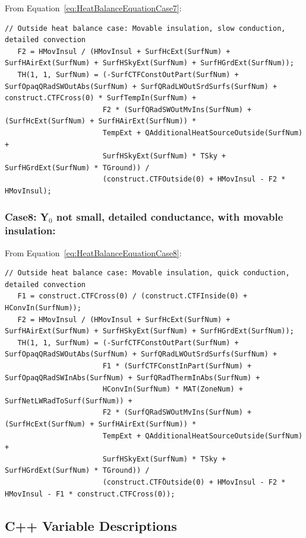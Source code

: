 From Equation~\ref{eq:HeatBalanceEquationCase7}:

\begin{lstlisting}
// Outside heat balance case: Movable insulation, slow conduction, detailed convection
   F2 = HMovInsul / (HMovInsul + SurfHcExt(SurfNum) + SurfHAirExt(SurfNum) + SurfHSkyExt(SurfNum) + SurfHGrdExt(SurfNum));
   TH(1, 1, SurfNum) = (-SurfCTFConstOutPart(SurfNum) + SurfOpaqQRadSWOutAbs(SurfNum) + SurfQRadLWOutSrdSurfs(SurfNum) + construct.CTFCross(0) * SurfTempIn(SurfNum) +
                       F2 * (SurfQRadSWOutMvIns(SurfNum) + (SurfHcExt(SurfNum) + SurfHAirExt(SurfNum)) *
                       TempExt + QAdditionalHeatSourceOutside(SurfNum) +
                       SurfHSkyExt(SurfNum) * TSky + SurfHGrdExt(SurfNum) * TGround)) /
                       (construct.CTFOutside(0) + HMovInsul - F2 * HMovInsul);
\end{lstlisting}

\subsubsection{Case8: Y\(_{0}\) not small, detailed conductance, with movable insulation:}\label{case8-yux5f0-not-small-detailed-conductance-with-movable-insulation-1}

From Equation~\ref{eq:HeatBalanceEquationCase8}:

\begin{lstlisting}
// Outside heat balance case: Movable insulation, quick conduction, detailed convection
   F1 = construct.CTFCross(0) / (construct.CTFInside(0) + HConvIn(SurfNum));
   F2 = HMovInsul / (HMovInsul + SurfHcExt(SurfNum) + SurfHAirExt(SurfNum) + SurfHSkyExt(SurfNum) + SurfHGrdExt(SurfNum));
   TH(1, 1, SurfNum) = (-SurfCTFConstOutPart(SurfNum) + SurfOpaqQRadSWOutAbs(SurfNum) + SurfQRadLWOutSrdSurfs(SurfNum) +
                       F1 * (SurfCTFConstInPart(SurfNum) + SurfOpaqQRadSWInAbs(SurfNum) + SurfQRadThermInAbs(SurfNum) +
                       HConvIn(SurfNum) * MAT(ZoneNum) + SurfNetLWRadToSurf(SurfNum)) +
                       F2 * (SurfQRadSWOutMvIns(SurfNum) + (SurfHcExt(SurfNum) + SurfHAirExt(SurfNum)) *
                       TempExt + QAdditionalHeatSourceOutside(SurfNum) +
                       SurfHSkyExt(SurfNum) * TSky + SurfHGrdExt(SurfNum) * TGround)) /
                       (construct.CTFOutside(0) + HMovInsul - F2 * HMovInsul - F1 * construct.CTFCross(0));
\end{lstlisting}

\subsection{C++ Variable Descriptions}\label{c++-variable-descriptions}

